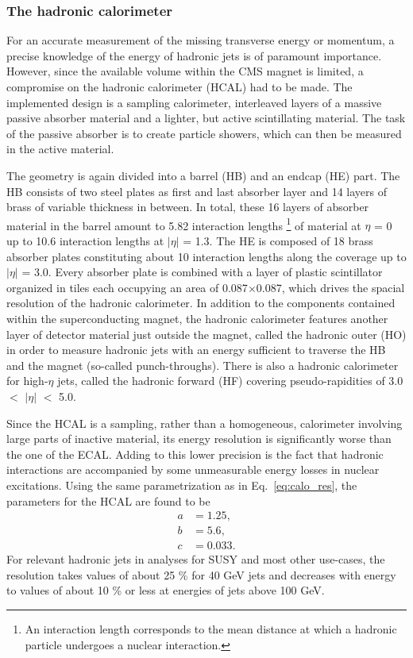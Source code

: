 \subsubsection*{The hadronic calorimeter}
For an accurate measurement of the missing transverse energy or momentum, a precise knowledge of the energy of hadronic jets is of 
paramount importance. However, since the available volume within the CMS magnet is limited, a compromise on the hadronic calorimeter (HCAL)
had to be made. The implemented design is a sampling calorimeter, interleaved layers of a massive passive absorber material and a lighter,
but active scintillating material. The task of the passive absorber is to create particle showers, which can then be measured in the active
material. 

The geometry is again divided into a barrel (HB) and an endcap (HE) part. The HB consists of two steel plates as first and last absorber layer and
14 layers of brass of variable thickness in between. In total, these 16 layers of absorber material in the barrel amount to 5.82 interaction lengths
\footnote{An interaction length corresponds to the mean distance at which a hadronic particle undergoes a nuclear interaction.} 
of material at $\eta$ = 0 up to 10.6 interaction lengths at $|\eta|$ = 1.3. The HE
is composed of 18 brass absorber plates constituting about 10 interaction lengths along the coverage up to $|\eta|$ = 3.0.
Every absorber plate is combined with a layer of plastic scintillator organized in tiles each occupying an area of 0.087$\times$0.087, which drives 
the spacial resolution of the hadronic calorimeter. In addition to the components contained within the superconducting magnet, the hadronic calorimeter
features another layer of detector material just outside the magnet, called the hadronic outer (HO) in order to measure hadronic jets with an energy
sufficient to traverse the HB and the magnet (so-called punch-throughs). There is also a hadronic calorimeter for high-$\eta$ jets, called the hadronic forward (HF) covering 
pseudo-rapidities of 3.0 $<$ $|\eta|$ $<$ 5.0.

Since the HCAL is a sampling, rather than a homogeneous, calorimeter involving large parts of inactive material, its energy resolution is significantly
worse than the one of the ECAL. Adding to this lower precision is the fact that hadronic interactions are accompanied by some unmeasurable energy 
losses in nuclear excitations. Using the same parametrization as in Eq.~\ref{eq:calo_res}, the parameters for the HCAL are found to be
\begin{align*}
    a &= 1.25, \\
    b &= 5.6, \\
    c &= 0.033.  
\end{align*}
For relevant hadronic jets in analyses for SUSY and most other use-cases, the resolution takes values of about 25 \% for 40 GeV jets and decreases
with energy to values of about 10 \% or less at energies of jets above 100 GeV.

